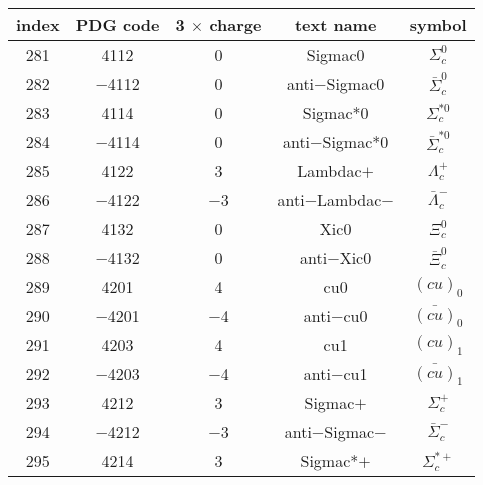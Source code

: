 \documentclass{article}
\begin{document}
\begin{table}[!htbp]
\centering
\begin{tabular}{|c|c|c|c|c|}
\hline
index & PDG code & 3 $\times$ charge & text name & symbol \\
\hline
281 & 4112 & 0 & Sigma\underline{\hspace{0.6em}}c0 & $\Sigma_{c}^{0}$ \\
\hline
282 & $-$4112 & 0 & anti$-$Sigma\underline{\hspace{0.6em}}c0 & $\bar{\Sigma}_{c}^{0}$ \\
\hline
283 & 4114 & 0 & Sigma\underline{\hspace{0.6em}}c*0 & $\Sigma_{c}^{*0}$ \\
\hline
284 & $-$4114 & 0 & anti$-$Sigma\underline{\hspace{0.6em}}c*0 & $\bar{\Sigma}_{c}^{*0}$ \\
\hline
285 & 4122 & 3 & Lambda\underline{\hspace{0.6em}}c$+$ & $\Lambda_{c}^{+}$ \\
\hline
286 & $-$4122 & $-$3 & anti$-$Lambda\underline{\hspace{0.6em}}c$-$ & $\bar{\Lambda}_{c}^{-}$ \\
\hline
287 & 4132 & 0 & Xi\underline{\hspace{0.6em}}c0 & $\Xi_{c}^{0}$ \\
\hline
288 & $-$4132 & 0 & anti$-$Xi\underline{\hspace{0.6em}}c0 & $\bar{\Xi}_{c}^{0}$ \\
\hline
289 & 4201 & 4 & cu\underline{\hspace{0.6em}}0 & $(cu)_{0}$ \\
\hline
290 & $-$4201 & $-$4 & anti$-$cu\underline{\hspace{0.6em}}0 & $\bar{(cu)}_{0}$ \\
\hline
291 & 4203 & 4 & cu\underline{\hspace{0.6em}}1 & $(cu)_{1}$ \\
\hline
292 & $-$4203 & $-$4 & anti$-$cu\underline{\hspace{0.6em}}1 & $\bar{(cu)}_{1}$ \\
\hline
293 & 4212 & 3 & Sigma\underline{\hspace{0.6em}}c$+$ & $\Sigma_{c}^{+}$ \\
\hline
294 & $-$4212 & $-$3 & anti$-$Sigma\underline{\hspace{0.6em}}c$-$ & $\bar{\Sigma}_{c}^{-}$ \\
\hline
295 & 4214 & 3 & Sigma\underline{\hspace{0.6em}}c*$+$ & $\Sigma_{c}^{*+}$ \\

\end{tabular}
\end{table}
\end{document}
